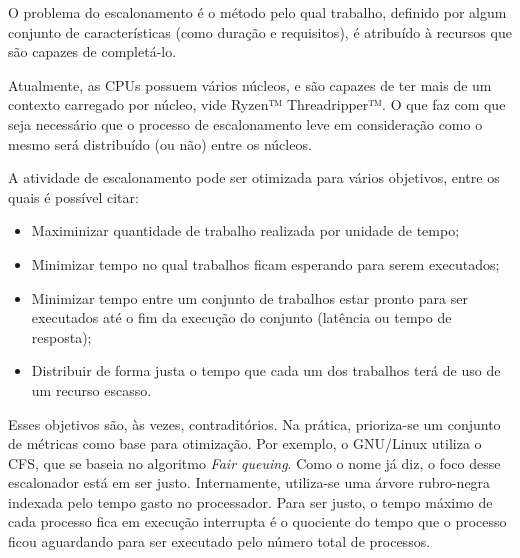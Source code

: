 

O problema do escalonamento é o método pelo qual trabalho, definido por algum conjunto de características (como duração e requisitos), é atribuído à recursos que são capazes de completá-lo. %

Atualmente, as \acrshort{CPU}s possuem vários núcleos, e são capazes de ter mais de um contexto carregado por núcleo, vide Ryzen™ Threadripper™\cite{Ryzen}. O que faz com que seja necessário que o processo de escalonamento leve em consideração como o mesmo será distribuído (ou não) entre os núcleos.

A atividade de escalonamento pode ser otimizada para vários objetivos, entre os quais é possível citar:
\begin{itemize}
	\item Maximinizar quantidade de trabalho realizada por unidade de tempo;
	\item Minimizar tempo no qual trabalhos ficam esperando para serem executados;
	\item Minimizar tempo entre um conjunto de trabalhos estar pronto para ser executados até o fim da execução do conjunto (latência ou tempo de resposta);
	\item Distribuir de forma justa o tempo que cada um dos trabalhos terá de uso de um recurso escasso.
\end{itemize}

Esses objetivos são, às vezes, contraditórios. Na prática, prioriza-se um conjunto de métricas como base para otimização. Por exemplo, o GNU/Linux utiliza o \acrfull{CFS}, que se baseia no algoritmo \textit{Fair queuing}. Como o nome já diz, o foco desse escalonador está em ser justo. Internamente, utiliza-se uma árvore rubro-negra indexada pelo tempo gasto no processador. Para ser justo, o tempo máximo de cada processo fica em execução interrupta é o quociente do tempo que o processo ficou aguardando para ser executado pelo número total de processos.

